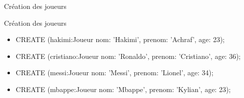\begin{frame}{Création des joueurs}
  \begin{block}{Création des joueurs}
    \begin{itemize}
      \item CREATE (hakimi:Joueur {nom: 'Hakimi', prenom: 'Achraf', age: 23});
      \item CREATE (cristiano:Joueur {nom: 'Ronaldo', prenom: 'Cristiano', age: 36});
      \item CREATE (messi:Joueur {nom: 'Messi', prenom: 'Lionel', age: 34});
      \item CREATE (mbappe:Joueur {nom: 'Mbappe', prenom: 'Kylian', age: 23});
    \end{itemize}
  \end{block}
\end{frame}